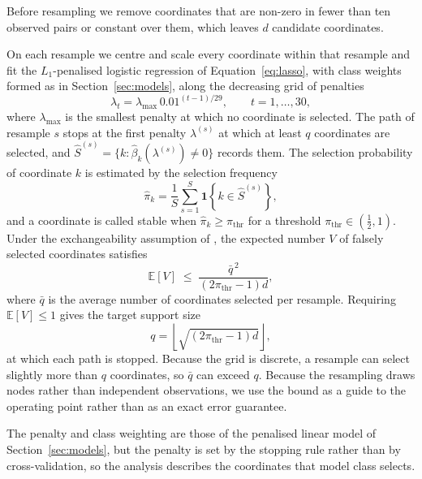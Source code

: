 Before resampling we remove coordinates that are non-zero in fewer than ten observed pairs or constant over
them, which leaves \(d\) candidate coordinates.

On each resample we centre and scale every coordinate within that resample and fit the
\(L_{1}\)-penalised logistic regression of Equation~\eqref{eq:lasso}, with class weights formed as in
Section~\ref{sec:models}, along the decreasing grid of penalties
\begin{equation}\label{eq:ssgrid}
 \lambda_{t}=\lambda_{\max}\,0.01^{(t-1)/29},\qquad t=1,\ldots,30,
\end{equation}
where \(\lambda_{\max}\) is the smallest penalty at which no coordinate is selected. The path of resample
\(s\) stops at the first penalty \(\lambda^{(s)}\) at which at least \(q\) coordinates are selected, and
\(\widehat S^{(s)}=\{k:\widehat\beta_{k}(\lambda^{(s)})\neq0\}\) records them. The selection probability
of coordinate \(k\) is estimated by the selection frequency
\begin{equation}\label{eq:pisel}
 \widehat\pi_{k}
 =\frac{1}{S}\sum_{s=1}^{S}\mathbf{1}\!\left\{k\in\widehat S^{(s)}\right\},
\end{equation}
and a coordinate is called stable when \(\widehat\pi_{k}\geq\pi_{\mathrm{thr}}\) for a threshold
\(\pi_{\mathrm{thr}}\in(\tfrac{1}{2},1)\). Under the exchangeability assumption of
\citet{meinshausen2010}, the expected number \(V\) of falsely selected coordinates satisfies
\begin{equation}\label{eq:mbbound}
 \mathbb{E}[V]\;\leq\;\frac{\bar q^{\,2}}{\left(2\pi_{\mathrm{thr}}-1\right)d},
\end{equation}
where \(\bar q\) is the average number of coordinates selected per resample. Requiring
\(\mathbb{E}[V]\leq1\) gives the target support size
\begin{equation}\label{eq:qbound}
 q=\left\lfloor\sqrt{\left(2\pi_{\mathrm{thr}}-1\right)d}\right\rfloor,
\end{equation}
at which each path is stopped. Because the grid is discrete, a resample can select slightly more than
\(q\) coordinates, so \(\bar q\) can exceed \(q\). Because the resampling draws nodes rather than
independent observations, we use the bound as a guide to the operating point rather than as an exact
error guarantee.

The penalty and class weighting are those of the penalised linear model of Section~\ref{sec:models}, but
the penalty is set by the stopping rule rather than by cross-validation, so the analysis describes the
coordinates that model class selects.

